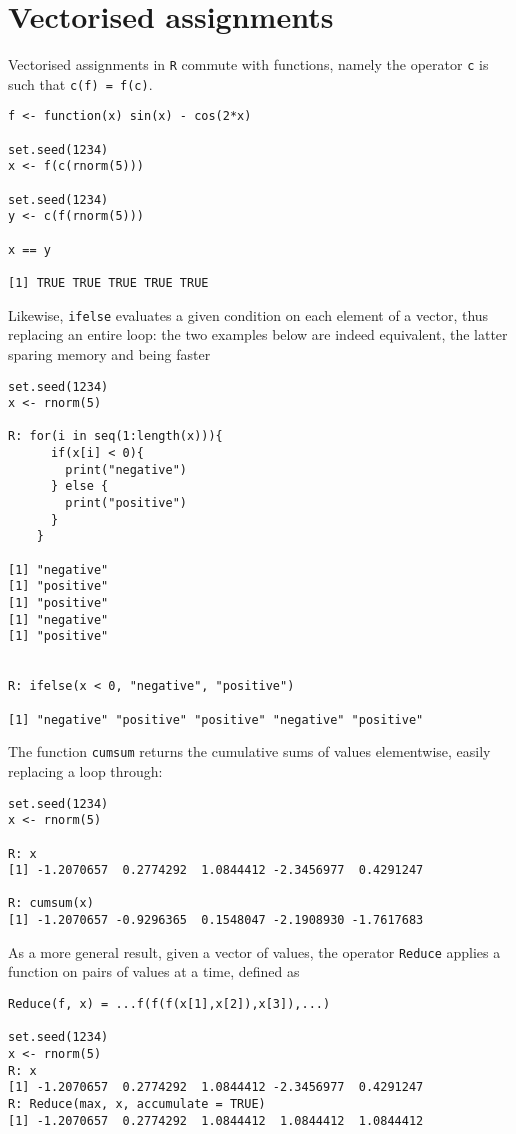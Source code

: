 \section{Vectorised assignments}
Vectorised assignments in \texttt{R} commute with 
functions, namely the operator \texttt{c} is such
that \texttt{c(f) = f(c)}.
\begin{verbatim}
f <- function(x) sin(x) - cos(2*x)

set.seed(1234)
x <- f(c(rnorm(5)))

set.seed(1234)
y <- c(f(rnorm(5)))

x == y

[1] TRUE TRUE TRUE TRUE TRUE
\end{verbatim}
Likewise, \texttt{ifelse} evaluates a given 
condition on each element of a vector, thus 
replacing an entire loop: the two examples 
below are indeed equivalent, the latter sparing
memory and being faster
\begin{verbatim}
set.seed(1234)
x <- rnorm(5)

R: for(i in seq(1:length(x))){
      if(x[i] < 0){
        print("negative")
      } else {
        print("positive")
      }
    }

[1] "negative"
[1] "positive"
[1] "positive"
[1] "negative"
[1] "positive"


R: ifelse(x < 0, "negative", "positive")

[1] "negative" "positive" "positive" "negative" "positive"
\end{verbatim}
The function \texttt{cumsum} returns the cumulative 
sums of values elementwise, easily replacing a 
loop through:
\begin{verbatim}
set.seed(1234)
x <- rnorm(5)

R: x
[1] -1.2070657  0.2774292  1.0844412 -2.3456977  0.4291247

R: cumsum(x)
[1] -1.2070657 -0.9296365  0.1548047 -2.1908930 -1.7617683
\end{verbatim}
\enlargethispage{\baselineskip}
As a more general result, given a vector of 
values, the operator \texttt{Reduce}
applies a function on pairs of values at 
a time, defined as
\begin{verbatim}
Reduce(f, x) = ...f(f(f(x[1],x[2]),x[3]),...)

set.seed(1234)
x <- rnorm(5)
R: x
[1] -1.2070657  0.2774292  1.0844412 -2.3456977  0.4291247
R: Reduce(max, x, accumulate = TRUE)
[1] -1.2070657  0.2774292  1.0844412  1.0844412  1.0844412
\end{verbatim}




